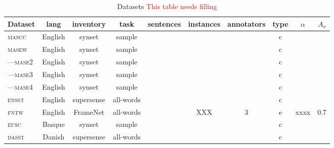 \documentclass[11pt,a4paper]{article}
\begin{document}
\begin{table}[Ht!]

\begin{center}
  \begin{tabular}{lccccccccc}
  \toprule 

Dataset& lang & inventory & task & sentences & instances & annotators & type & $\alpha$ & $A_o$ \\ 
\midrule 

\textsc{mascc} & English & synset & sample & & & & c & \\
\textsc{masew} & English & synset & sample & & & & c & \\
---\textsc{mase2} & English & synset & sample & & & & c & \\
---\textsc{mase3} & English & synset & sample & & & & c & \\
---\textsc{mase4} & English & synset & sample & & & & c & \\
\textsc{ensst} & English & supersense & all-words & & & & c & \\
\textsc{fntw} & English & FrameNet & all-words & & XXX & 3 & e & xxxx & 0.7 \\
\textsc{eusc} & Basque & synset & sample & & & & c & \\
\textsc{dasst} & Danish & supersense & all-words & & & & c & \\


\bottomrule

  \end{tabular}  
\end{center}
\caption{Datasets \label{tab:data} \textcolor{red}{This table needs filling}}
\end{table} 
\end{document}
